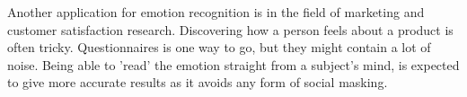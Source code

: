 \npar

Another application for emotion recognition is in the field of marketing and customer satisfaction research. Discovering how a person feels about a product is often tricky. Questionnaires is one way to go, but they might contain a lot of noise. Being able to 'read' the emotion straight from a subject's mind, is expected to give more accurate results as it avoids any form of social masking.